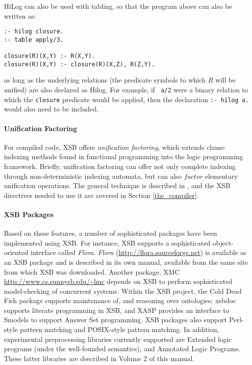 HiLog can also be used with tabling, so that the program above can also be
written as:
\begin{center}
\begin{minipage}{3.7in}
\begin{verbatim}
:- hilog closure.
:- table apply/3.

closure(R)(X,Y) :- R(X,Y).
closure(R)(X,Y) :- closure(R)(X,Z), R(Z,Y).
\end{verbatim}
\end{minipage}
\end{center}
as long as the underlying relations (the predicate symbols to which
$R$ will be unified) are also declared as Hilog.  For example, if {\tt
a/2} were a binary relation to which the {\tt closure} predicate would
be applied, then the declaration {\tt :- hilog a.} would also need to
be included.

\paragraph{Unification Factoring} For compiled code, XSB offers {\em
  unification factoring}, which extends clause indexing methods found
in functional programming into the logic programming framework.
Briefly, unification factoring can offer not only complete indexing
through non-deterministic indexing automata, but can also $factor$
elementary unification operations.  The general technique is described
in \cite{DRSS96}, and the XSB directives needed to use it are covered
in Section \ref{the_compiler}.

  
\paragraph{XSB Packages} Based on these features, a number of
sophisticated packages have been implemented using XSB.  For instance,
XSB supports a sophisticated object-oriented interface called {\em
  Flora}.  {\em Flora} (\url{http://flora.sourceforge.net}) is
available as an XSB package and is described in its own manual,
available from the same site from which XSB was downloaded.  Another
package, XMC \url{http://www.cs.sunnysb.edu/~lmc} depends on XSB to
perform sophisticated model-checking of concurrent systems.  Within
the XSB project, the Cold Dead Fish package supports maintenance of,
and reasoning over ontologies; xsbdoc supports literate programming in
XSB, and XASP provides an interface to Smodels to support Answer Set
programming.  XSB packages also support Perl-style pattern matching
and POSIX-style pattern matching.  In addition, experimental
preprocessing libraries currently supported are Extended logic
programs (under the well-founded semantics), and Annotated Logic
Programs.  These latter libraries are described in Volume 2 of this
manual.

